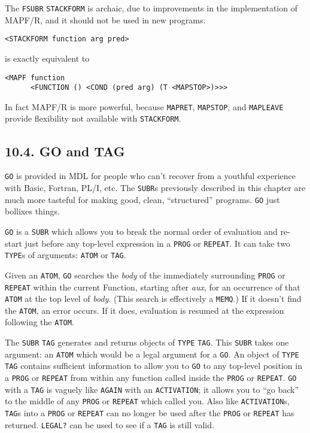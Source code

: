 \documentclass[a4paper,]{article}
\begin{document}
The \texttt{FSUBR}  \texttt{STACKFORM}  is archaic, due to improvements in
the implementation of MAPF/R, and it should not be used in new programs.

\begin{verbatim}
<STACKFORM function arg pred>
\end{verbatim}

is exactly equivalent to

\begin{verbatim}
<MAPF function
      <FUNCTION () <COND (pred arg) (T <MAPSTOP>)>>>
\end{verbatim}

In fact MAPF/R is more powerful, because \texttt{MAPRET}, \texttt{MAPSTOP}, and \texttt{MAPLEAVE} provide flexibility not
available with \texttt{STACKFORM}.

\subsection{10.4. GO and TAG}\label{go-and-tag}

\texttt{GO}  is provided in MDL for people who can't recover from a youthful experience with
Basic, Fortran, PL/I, etc. The \texttt{SUBR}s previously described in this chapter are much more tasteful for making good,
clean, ``structured'' programs. \texttt{GO} just bollixes things.

\texttt{GO} is a \texttt{SUBR} which allows you to break the normal order of evaluation and re-start just before any
top-level expression in a \texttt{PROG} or \texttt{REPEAT}. It can take two \texttt{TYPE}s of arguments: \texttt{ATOM} or
\texttt{TAG}. 

Given an \texttt{ATOM}, \texttt{GO} searches the \emph{body} of the immediately surrounding \texttt{PROG} or
\texttt{REPEAT} within the current Function, starting after \emph{aux}, for an occurrence of that \texttt{ATOM} at the top
level of \emph{body}. (This search is effectively a \texttt{MEMQ}.) If it doesn't find the \texttt{ATOM}, an error occurs.
If it does, evaluation is resumed at the expression following the \texttt{ATOM}.

The \texttt{SUBR} \texttt{TAG} generates and returns objects of \texttt{TYPE} \texttt{TAG}. This \texttt{SUBR} takes one
argument: an \texttt{ATOM} which would be a legal argument for a \texttt{GO}. An object of \texttt{TYPE} \texttt{TAG}
contains sufficient information to allow you to \texttt{GO} to any top-level position in a \texttt{PROG} or \texttt{REPEAT}
from within any function called inside the \texttt{PROG} or \texttt{REPEAT}. \texttt{GO} with a \texttt{TAG} is vaguely
like \texttt{AGAIN} with an \texttt{ACTIVATION}; it allows you to ``go back'' to the middle of any \texttt{PROG} or
\texttt{REPEAT} which called you. Also like \texttt{ACTIVATION}s, \texttt{TAG}s into a \texttt{PROG} or \texttt{REPEAT} can
no longer be used after the \texttt{PROG} or \texttt{REPEAT} has returned. \texttt{LEGAL?}  can be
used to see if a \texttt{TAG} is still valid.
\end{document}
